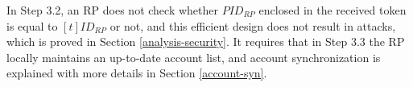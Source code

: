 In Step 3.2, an RP does not check whether $PID_{RP}$ enclosed in the received token is equal to $[t]ID_{RP}$ or not,
    and this efficient design does not result in attacks, which is proved in Section \ref{analysis-security}.
It requires that in Step 3.3 the RP locally maintains an up-to-date account list,
    and account synchronization is explained with more details in Section \ref{account-syn}.

%

